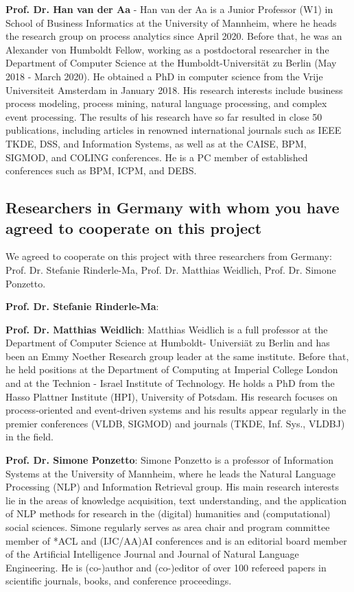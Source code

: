 \textbf{Prof. Dr. Han van der Aa} - Han van der Aa is a Junior Professor (W1) in School of Business Informatics at the University of Mannheim, where he heads the research group on process analytics since April 2020. Before that, he was an Alexander von Humboldt Fellow, working as a postdoctoral researcher in the Department of Computer Science at the Humboldt-Universität zu Berlin (May 2018 - March 2020). He obtained a PhD in computer science from the Vrije Universiteit Amsterdam in January 2018. His research interests include business process modeling, process mining, natural language processing, and complex event processing. 
The results of his research have so far resulted in close 50 publications, including articles in 
renowned international journals such as IEEE TKDE, DSS, and Information Systems, as well as at the CAISE, BPM, SIGMOD, and COLING conferences.
He is a PC member of established conferences such as BPM, ICPM, and DEBS.


\subsection{Researchers in Germany with whom you have agreed to cooperate on this project}
\label{sec:collab:germany}

We agreed to cooperate on this project with three researchers from Germany: Prof. Dr. Stefanie Rinderle-Ma, Prof. Dr. Matthias Weidlich, Prof. Dr. Simone Ponzetto. 

\textbf{Prof. Dr. Stefanie Rinderle-Ma}: 

 
\textbf{Prof. Dr. Matthias Weidlich}: Matthias Weidlich is a full professor at the Department of Computer Science at Humboldt- Universi\"at zu Berlin and has been an Emmy Noether Research group leader at the same institute. Before that, he held positions at the Department of Computing at Imperial College London and at the Technion - Israel Institute of Technology. He holds a PhD from the Hasso Plattner Institute (HPI), University of Potsdam. His research focuses on process-oriented and event-driven systems and his results appear regularly in the premier conferences (VLDB, SIGMOD) and journals (TKDE, Inf. Sys., VLDBJ) in the field.

\textbf{Prof. Dr. Simone Ponzetto}: Simone Ponzetto is a professor of Information Systems at the University of Mannheim, where he leads the Natural Language Processing (NLP) and Information Retrieval group. His main research interests lie in the areas of knowledge acquisition, text understanding, and the application of NLP methods for research in the (digital) humanities and (computational) social sciences. Simone regularly serves as area chair and program committee member of *ACL and (IJC/AA)AI conferences and is an editorial board member of the Artificial Intelligence Journal and Journal of Natural Language Engineering. He is (co-)author and (co-)editor of over 100 refereed papers in scientific journals, books, and conference proceedings.


